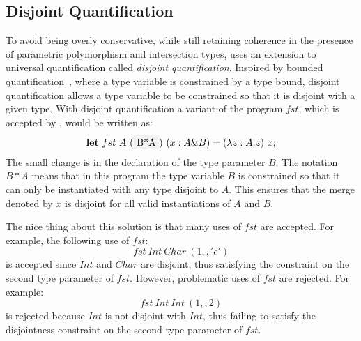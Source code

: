 \subsection{Disjoint Quantification}
To avoid being overly conservative, while still retaining coherence in the 
presence of parametric polymorphism and intersection types, \name uses 
an extension to universal quantification called \emph{disjoint quantification}. 
Inspired by
bounded quantification~\cite{Cardelli:1994}, 
where a type variable is constrained by a type
bound, disjoint quantification allows a type variable to be
constrained so that it is disjoint with a
given type. With disjoint quantification a variant of the program $fst$, which
is accepted by \name, would be written as:
\[{\bf let}~fst~A~(\fcolorbox{light-gray}{light-gray}{B*A})~(x : A \& B) = (\lambda z : A. z)~x;\]
The small change is in the declaration of the type parameter $B$. The notation 
$B*A$ means that in this program the type variable $B$ is constrained so that 
it can only be instantiated with any type disjoint to $A$. 
This ensures that the
merge denoted by $x$ is disjoint for all valid instantiations of $A$ and $B$.

The nice thing about this solution is that many uses of $fst$ are accepted. 
For example, the following use of $fst$:
\[fst~Int~Char~(1,,'c')\]
is accepted since $Int$ and $Char$ are disjoint, thus satisfying the constraint 
on the second type parameter of $fst$.
However, problematic uses of $fst$ are rejected. For example:
\[fst~Int~Int~(1,,2)\]
is rejected because $Int$ is not disjoint with $Int$, thus failing to satisfy the 
disjointness constraint on the second type parameter of $fst$.

\begin{comment}
Note that there is a nice symmetry between bounded quantification and disjoint quantification.
In systems with bounded quantification,
the usual unconstrained quantifier $\for {\alpha} \ldots$
is a syntactic sugar for $\for {\alpha \subtype \top} \ldots$, and
$\blam \alpha \ldots$ for $\blam {\alpha \subtype \top} \ldots$.
In parellel, in our system with disjoint quantification,
the usual unconstrained quantifier $\for {\alpha} \ldots$
is a syntactic sugar for $\for {\alpha \disjoint \bot} \ldots$, and
$\blam \alpha \ldots$ for $\blam {\alpha \disjoint \top} \ldots$.
The intuition is that since the bottom type is akin to the empty set,
no other type overlaps with it.\george{Format this paragraph better.}
\end{comment}


